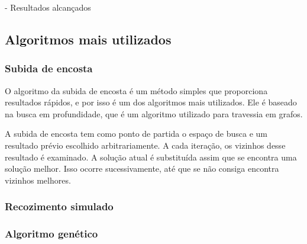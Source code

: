 - Resultados alcançados

\subsection{Algoritmos mais utilizados}

\subsubsection{Subida de encosta}

O algoritmo da subida de encosta é um método simples que proporciona resultados rápidos, e por isso é um dos algoritmos mais utilizados. Ele é baseado na busca em profundidade, que é um algoritmo utilizado para travessia em grafos. 

A subida de encosta tem como ponto de partida o espaço de busca e um resultado prévio escolhido arbitrariamente. A cada iteração, os vizinhos desse resultado é examinado. A solução atual é substituída assim que se encontra uma solução melhor. Isso ocorre sucessivamente, até que se não consiga encontra vizinhos melhores.  

\subsubsection{Recozimento simulado}

\subsubsection{Algoritmo genético}









